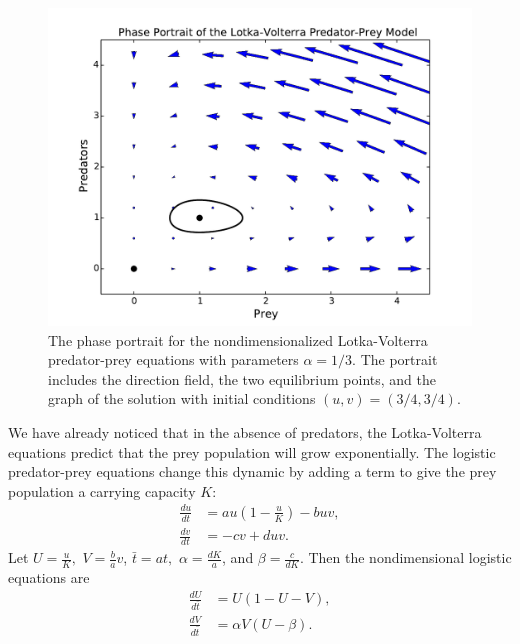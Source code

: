 \begin{figure}[ht]
\centering
\includegraphics[width=\textwidth]{Lotka_Volterra_Phase_Portrait.pdf}
\caption{The phase portrait for the nondimensionalized Lotka-Volterra 
predator-prey equations with parameters $\alpha = 1/3$. 
The portrait includes the direction field, the two equilibrium points, 
and the graph of the solution with initial conditions $(u,v) = (3/4, 3/4)$. }
\label{pred-prey:Lotka_Voterra_Phase_Portrait}
\end{figure}

We have already noticed that in the absence of predators, the Lotka-Volterra 
equations predict that the prey population will grow exponentially. The logistic 
predator-prey equations change this dynamic by adding a term to give the prey 
population a carrying capacity $K$: 
\begin{align*}
	\frac{du}{dt} &= au\left(1 -\frac{u}{K}\right) - buv,\\
	\frac{dv}{dt} &= -cv + duv.
\end{align*}
Let $U = \frac{u}{K},$ $V = \frac{b}{a}v$, $\bar{t} = at,$  
$\alpha = \frac{dK}{a}$, and $\beta = \frac{c}{dK}$. Then the nondimensional logistic
equations are 
\begin{align*}
	\frac{dU}{d\bar{t}} &= U(1-U-V),\\
	\frac{dV}{d\bar{t}} &= \alpha V (U-\beta).
\end{align*}


